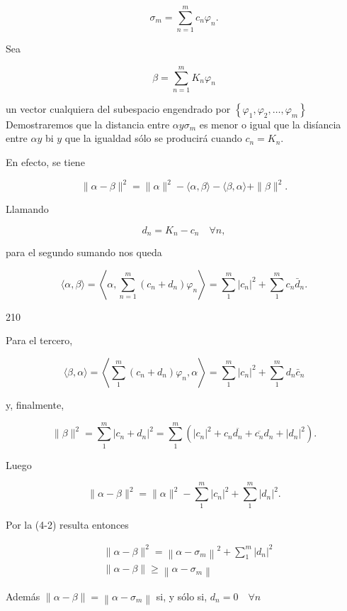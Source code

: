 \documentclass[10pt]{article}
\theoremstyle{plain}
\theoremstyle{definition}
\theoremstyle{remark}
\begin{document}
$$
\sigma_{m}=\sum_{n=1}^{m} c_{n} \varphi_{n} .
$$

Sea

$$
\beta=\sum_{n=1}^{m} K_{n} \varphi_{n}
$$

un vector cualquiera del subespacio engendrado por $\left\{\varphi_{1}, \varphi_{2}, \ldots, \varphi_{m}\right\}$\\
Demostraremos que la distancia entre $\alpha y \sigma_{m}$ es menor o igual que la disíancia entre $\alpha y$ bi $y$ que la igualdad sólo se producirá cuando $c_{n}=K_{n}$.

En efecto, se tiene

$$
\|\alpha-\beta\|^{2}=\|\alpha\|^{2}-\langle\alpha, \beta\rangle-\langle\beta, \alpha\rangle+\|\beta\|^{2} .
$$

Llamando

$$
d_{n}=K_{n}-c_{n} \quad \forall n,
$$

para el segundo sumando nos queda

$$
\langle\alpha, \beta\rangle=\left\langle\alpha, \sum_{n=1}^{m}\left(c_{n}+d_{n}\right) \varphi_{n}\right\rangle=\sum_{1}^{m}\left|c_{n}\right|^{2}+\sum_{1}^{m} c_{n} \bar{d}_{n} .
$$

210

Para el tercero,

$$
\langle\beta, \alpha\rangle=\left\langle\sum_{1}^{m}\left(c_{n}+d_{n}\right) \varphi_{n}, \alpha\right\rangle=\sum_{1}^{m}\left|c_{n}\right|^{2}+\sum_{1}^{m} d_{n} \bar{c}_{n}
$$

y, finalmente,

$$
\|\beta\|^{2}=\sum_{1}^{m}\left|c_{n}+d_{n}\right|^{2}=\sum_{1}^{m}\left(\left|c_{n}\right|^{2}+c_{n} \overline{d_{n}}+\overline{c_{n}} d_{n}+\left|d_{n}\right|^{2}\right) .
$$

Luego

$$
\|\alpha-\beta\|^{2}=\|\alpha\|^{2}-\sum_{1}^{m}\left|c_{n}\right|^{2}+\sum_{1}^{m}\left|d_{n}\right|^{2} .
$$

Por la (4-2) resulta entonces


\begin{align*}
& \|\alpha-\beta\|^{2}=\left\|\alpha-\sigma_{m}\right\|^{2}+\sum_{1}^{m}\left|d_{n}\right|^{2}  \tag{4-4}\\
& \|\alpha-\beta\| \geqslant\left\|\alpha-\sigma_{m}\right\|
\end{align*}


Además $\|\alpha-\beta\|=\left\|\alpha-\sigma_{m}\right\|$ si, y sólo si, $d_{n}=0 \quad \forall n$
\end{document}
